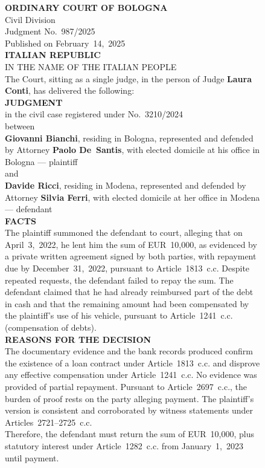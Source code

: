 \begin{figure}[htbp]
\centering
\begin{minipage}{0.9\linewidth}
\small
\textbf{ORDINARY COURT OF BOLOGNA}\\
Civil Division\\
Judgment No.~987/2025\\
Published on February~14,~2025\\[0.5em]
\textbf{ITALIAN REPUBLIC}\\
IN THE NAME OF THE ITALIAN PEOPLE\\[0.5em]
The Court, sitting as a single judge, in the person of Judge \textbf{Laura Conti}, has delivered the following:\\[0.5em]
\textbf{JUDGMENT}\\[0.3em]
in the civil case registered under No.~3210/2024\\
between\\[0.3em]
\textbf{Giovanni Bianchi}, residing in Bologna, represented and defended by Attorney \textbf{Paolo De~Santis}, with elected domicile at his office in Bologna --- plaintiff\\[0.3em]
and\\[0.3em]
\textbf{Davide Ricci}, residing in Modena, represented and defended by Attorney \textbf{Silvia Ferri}, with elected domicile at her office in Modena --- defendant\\[0.5em]

\textbf{FACTS}\\
The plaintiff summoned the defendant to court, alleging that on April~3,~2022, he lent him the sum of EUR~10,000, as evidenced by a private written agreement signed by both parties, with repayment due by December~31,~2022, pursuant to Article~1813~c.c. Despite repeated requests, the defendant failed to repay the sum. The defendant claimed that he had already reimbursed part of the debt in cash and that the remaining amount had been compensated by the plaintiff's use of his vehicle, pursuant to Article~1241~c.c. (compensation of debts).\\[0.5em]

\textbf{REASONS FOR THE DECISION}\\
The documentary evidence and the bank records produced confirm the existence of a loan contract under Article~1813~c.c. and disprove any effective compensation under Article~1241~c.c. No evidence was provided of partial repayment. Pursuant to Article~2697~c.c., the burden of proof rests on the party alleging payment. The plaintiff's version is consistent and corroborated by witness statements under Articles~2721--2725~c.c.\\
Therefore, the defendant must return the sum of EUR~10,000, plus statutory interest under Article~1282~c.c. from January~1,~2023 until payment.\\[0.5em]


\end{minipage}
\end{figure}
